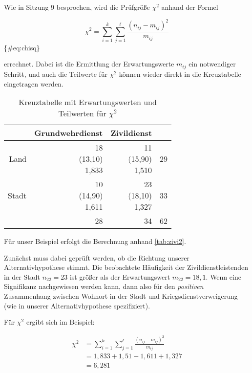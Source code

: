 \documentclass[
  ngerman,
]{article}
\begin{document}
Wie in Sitzung 9 besprochen, wird die Prüfgröße \(\chi^2\) anhand der Formel

\[
\chi^2= \sum_{i=1}^{k}\sum_{j=1}^{\ell}\frac{(n_{ij}-m_{ij})^{2}}{m_{ij}}
\]\{\#eq:chisq\}

errechnet. Dabei ist die Ermittlung der Erwartungswerte \(m_{ij}\) ein notwendiger Schritt, und auch die Teilwerte für \(\chi^2\) können wieder direkt in die Kreuztabelle eingetragen werden.

\begin{table}

\caption{\label{tab:zivi2}Kreuztabelle mit Erwartungswerten und Teilwerten für $\chi^2$}
\centering
\begin{tabular}[t]{>{}r|r>{}r|r}
\toprule
 & Grundwehrdienst & Zivildienst & \\
\midrule
Land & \makecell[tr]{18\\(13,10)\\\textcolor{goethe_blue}{1,833}} & \makecell[tr]{11\\(15,90)\\\textcolor{goethe_blue}{1,510}} & 29\\
Stadt & \makecell[tr]{10\\(14,90)\\\textcolor{goethe_blue}{1,611}} & \makecell[tr]{23\\(18,10)\\\textcolor{goethe_blue}{1,327}} & 33\\
\midrule
 & 28 & 34 & 62\\
\bottomrule
\end{tabular}
\end{table}

Für unser Beispiel erfolgt die Berechnung anhand \autoref{tab:zivi2}.

Zunächst muss dabei geprüft werden, ob die Richtung unserer Alternativhypothese stimmt. Die beobachtete Häufigkeit der Zivildienstleistenden in der Stadt \(n_{22}=23\) ist größer als der Erwartungswert \(m_{22}=18,1\). Wenn eine Signifikanz nachgewiesen werden kann, dann also für den \emph{positiven} Zusammenhang zwischen Wohnort in der Stadt und Kriegsdienstverweigerung (wie in unserer Alternativhypothese spezifiziert).

Für \(\chi^2\) ergibt sich im Beispiel:

\[\begin{aligned}
\chi^2 &= \sum_{i=1}^{k}\sum_{j=1}^{\ell}\frac{(n_{ij}-m_{ij})^{2}}{m_{ij}}\\[4pt]
&=1,833+1,51+1,611+1,327\\
&=6,281
\end{aligned}\]
\end{document}
